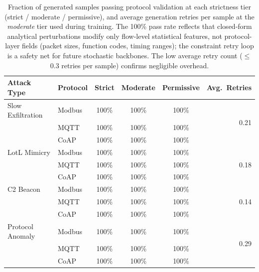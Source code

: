 
\begin{table}[h]
\centering
\caption{
  Fraction of generated samples passing protocol validation at each
  strictness tier (strict / moderate / permissive), and average generation
  retries per sample at the \emph{moderate} tier used during training.
  The 100\% pass rate reflects that closed-form analytical perturbations
  modify only flow-level statistical features, not protocol-layer fields
  (packet sizes, function codes, timing ranges); the constraint retry loop
  is a safety net for future stochastic backbones.
  The low average retry count ($\leq$0.3 retries per sample) confirms negligible overhead.
}
\label{tab:constraints}
\begin{tabular}{llcccr}
\toprule
Attack Type & Protocol & Strict & Moderate & Permissive & Avg.\ Retries \\
\midrule
Slow Exfiltration  & Modbus & 100\% & 100\% & 100\% & \multirow{3}{*}{0.21} \\
                   & MQTT   & 100\% & 100\% & 100\% &  \\
                   & CoAP   & 100\% & 100\% & 100\% &  \\
\midrule
LotL Mimicry       & Modbus & 100\% & 100\% & 100\% & \multirow{3}{*}{0.18} \\
                   & MQTT   & 100\% & 100\% & 100\% &  \\
                   & CoAP   & 100\% & 100\% & 100\% &  \\
\midrule
C2 Beacon          & Modbus & 100\% & 100\% & 100\% & \multirow{3}{*}{0.14} \\
                   & MQTT   & 100\% & 100\% & 100\% &  \\
                   & CoAP   & 100\% & 100\% & 100\% &  \\
\midrule
Protocol Anomaly   & Modbus & 100\% & 100\% & 100\% & \multirow{3}{*}{0.29} \\
                   & MQTT   & 100\% & 100\% & 100\% &  \\
                   & CoAP   & 100\% & 100\% & 100\% &  \\
\bottomrule
\end{tabular}
\end{table}
